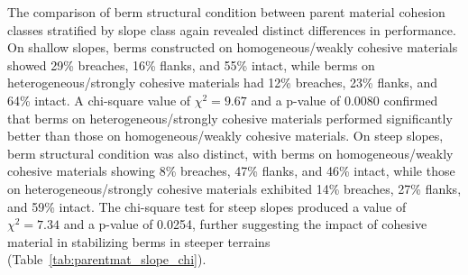 \documentclass[review]{elsarticle}
\begin{document}

The comparison of berm structural condition between parent material cohesion classes stratified by slope class again revealed distinct differences in performance. On shallow slopes, berms constructed on homogeneous/weakly cohesive materials showed 29\% breaches, 16\% flanks, and 55\% intact, while berms on heterogeneous/strongly cohesive materials had 12\% breaches, 23\% flanks, and 64\% intact. A chi-square value of $\chi^2 = 9.67$ and a p-value of 0.0080 confirmed that berms on heterogeneous/strongly cohesive materials performed significantly better than those on homogeneous/weakly cohesive materials. On steep slopes, berm structural condition was also distinct, with berms on homogeneous/weakly cohesive materials showing 8\% breaches, 47\% flanks, and 46\% intact, while those on heterogeneous/strongly cohesive materials exhibited 14\% breaches, 27\% flanks, and 59\% intact. The chi-square test for steep slopes produced a value of $\chi^2 = 7.34$ and a p-value of 0.0254, further suggesting the impact of cohesive material in stabilizing berms in steeper terrains (Table~\ref{tab:parentmat_slope_chi}).
\end{document}
